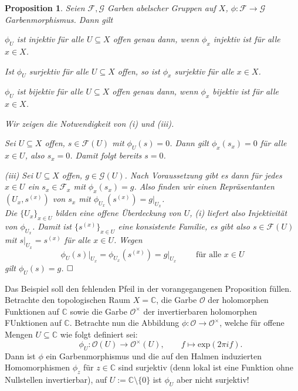 \documentclass[11pt]{book}
\newtheorem{proposition}[theorem]{Proposition}
\theoremstyle{nonumberbreak}
\newenvironment{pr}[1][]{\ifthenelse{\equal{#1}{}}{\proof}{\proof[#1]}\rm}{\endproof}
\newenvironment{ex}[1][]{\ifthenelse{\equal{#1}{}}{\example}{\example[#1]}\rm}{\endexample}
\begin{document}
\begin{spacing}{1.4}
\newcommand{\F}{\mathcal{F}}
\newcommand{\G}{\mathcal{G}}

\begin{proposition}
Seien $\mathcal{F}, \mathcal{G}$ Garben abelscher Gruppen auf $X$, $\phi: \mathcal{F} \longrightarrow \mathcal{G}$ Garbenmorphismus. Dann gilt
\begin{compactenum}
\item 
$\phi_U$ ist injektiv für alle $U \subseteq X$ offen genau dann, wenn $\phi_x$ injektiv ist für alle $x \in X$.
\item Ist $\phi_U$ surjektiv für alle $U \subseteq X$ offen, so ist $\phi_x$ surjektiv für alle $x \in X$.
\item $\phi_U$ ist bijektiv für alle $U \subseteq X$ offen genau dann, wenn $\phi_x$ bijektiv ist für alle $x \in X$.
\end{compactenum}
\begin{pr}
Wir zeigen die Notwendigkeit von (i) und (iii).
\begin{compactenum}

\item Sei $U \subseteq X$ offen, $s\in \mathcal{F}(U)$ mit $\phi_U(s) = 0$.
Dann gilt $\phi_x(s_x) =0$ für alle $x\in U$, also $s_x = 0$.
Damit folgt bereits $s = 0$.

\item[(iii)] Sei $U \subseteq X$ offen, $g \in \mathcal{G}(U)$. Nach Voraussetzung gibt es dann für jedes $x \in U$ ein $s_x \in \F_x $ mit $\phi_x(s_x) = g$.
Also finden wir einen Repräsentanten $\left(U_x, s^{(x)}\right)$ von $s_x$ mit $\phi_{U_x}(s^{(x)})=g\vert_{U_x}$.\\
Die $\{U_x\}_{x \in U}$ bilden eine offene Überdeckung von $U$, (i) liefert also Injektivität von $\phi_{U_x}$. Damit ist $\{s^{(x)}\}_{x\in U}$ eine konsistente Familie, es gibt also $s\in \F(U)$ mit $ s\vert_{U_x} = s^{(x)}$ für alle $x \in U$. Wegen 
$$\phi_U(s)\vert_{U_x} = \phi_{U_x}(s^{(x)})= g\vert _{U_x} \qquad \textrm { für alle } x \in U$$ gilt $\phi_U (s) = g$. $\hfill\Box$

\end{compactenum}

\end{pr}
\end{proposition}

\begin{ex}
Das Beispiel soll den fehlenden Pfeil in der vorangegangenen Proposition füllen. Betrachte den topologischen Raum $X= \mathbb{C}$, die Garbe $\mathcal{O}$ der holomorphen Funktionen auf $\mathbb{C}$ sowie die Garbe $\mathcal{O}^{\times}$ der invertierbaren holomorphen FUnktionen auf $\mathbb{C}$. Betrachte nun die Abbildung
$\phi: \mathcal{O} \longrightarrow \mathcal{O}^{\times}$, welche für offene Mengen $U \subseteq \mathbb{C}$ wie folgt definiert sei:
$$\qquad \phi_U: \mathcal{O}(U) \longrightarrow \mathcal{O}^{\times}(U), \qquad f \mapsto \mathrm{exp}(2\pi i f).$$
Dann ist $\phi$ ein Garbenmorphismus und die auf den Halmen induzierten Homomorphismen $\phi_z$ für $z \in \mathbb{C}$ sind surjektiv (denn lokal ist eine Funktion ohne Nullstellen invertierbar), auf $U:= \mathbb{C}\setminus \{0\}$ ist $\phi_U$ aber nicht surjektiv!
\end{ex}



\end{spacing}
\end{document}
